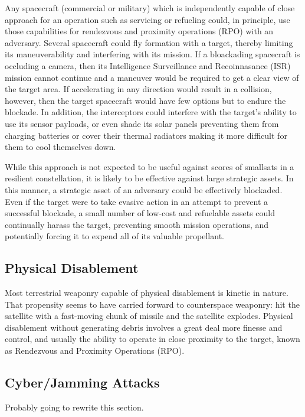 Any spacecraft (commercial or military) which is independently capable
of close approach for an operation such as servicing or refueling
could, in principle, use those capabilities for rendezvous and
proximity operations (RPO) with an adversary.  Several spacecraft
could fly formation with a target, thereby limiting its
maneuverability and interfering with its mission.  If a bloackading
spacecraft is occluding a camera, then its Intelligence Surveillance
and Recoinnasance (ISR) mission cannot continue and a maneuver would
be required to get a clear view of the target area.  If accelerating
in any direction would result in a collision, however, then the target
spacecraft would have few options but to endure the blockade.  In
addition, the interceptors could interfere with the target's ability
to use its sensor payloads, or even shade its solar panels preventing
them from charging batteries or cover their thermal radiators making
it more difficult for them to cool themselves down.

While this approach is not expected to be useful against scores of
smallsats in a resilient constellation, it is likely to be effective
against large strategic assets. In this manner, a strategic asset of
an adversary could be effectively blockaded.  Even if the target were
to take evasive action in an attempt to prevent a successful blockade,
a small number of low-cost and refuelable assets could continually
harass the target, preventing smooth mission operations, and
potentially forcing it to expend all of its valuable propellant.

\subsection{Physical Disablement}
Most terrestrial weaponry capable of physical disablement is kinetic
in nature.  That propensity seems to have carried forward to
counterspace weaponry: hit the satellite with a fast-moving chunk of
missile and the satellite explodes.  Physical disablement without
generating debris involves a great deal more finesse and control, and
usually the ability to operate in close proximity to the target, known
as Rendezvous and Proximity Operations (RPO).

\subsection{Cyber/Jamming Attacks}
Probably going to rewrite this section.

